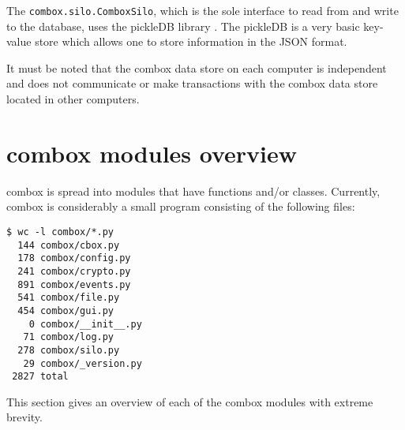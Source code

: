 The \verb+combox.silo.ComboxSilo+, which is the sole interface to read
from and write to the database, uses the pickleDB
library \cite{pylib:pickledb}. The pickleDB is a very basic key-value
store which allows one to store information in the JSON format.

It must be noted that the combox data store on each computer is
independent and does not communicate or make transactions with the
combox data store located in other computers.

\section{combox modules overview}

combox is spread into modules that have functions and/or classes. Currently, combox is considerably a small program consisting of the following files:

\begin{verbatim}
$ wc -l combox/*.py
  144 combox/cbox.py
  178 combox/config.py
  241 combox/crypto.py
  891 combox/events.py
  541 combox/file.py
  454 combox/gui.py
    0 combox/__init__.py
   71 combox/log.py
  278 combox/silo.py
   29 combox/_version.py
 2827 total
\end{verbatim}

This section gives an overview of each of the combox modules with
extreme brevity.

